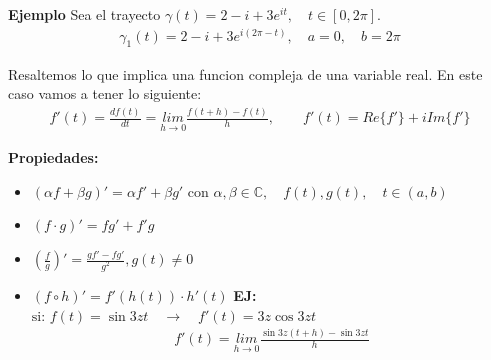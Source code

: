 \documentclass{article}
\begin{document}
\textbf{Ejemplo } Sea el trayecto $ \gamma (t) = 2-i + 3 e ^ {i t }, \quad t \in [0,2\pi ] $.
\begin{gather*}
  \gamma_1 (t) = 2- i + 3 e ^ {i(2\pi - t)}, \quad a= 0 , \quad b= 2\pi
\end{gather*}

\hfill 

\hfill

\hfill

Resaltemos lo que implica una funcion compleja de una variable real. En este caso vamos a tener lo siguiente: 
\begin{gather*}
  f'(t) = \frac{d f(t)  }{d t } = \underset{h \rightarrow 0 }{lim } \frac{f(t+h ) - f(t) }{h }, \qquad f'(t) = Re\{f' \} + i Im \{f' \}
\end{gather*}

\textbf{Propiedades: }
\begin{itemize}
  \item $ (\alpha f + \beta g )' = \alpha f' + \beta g'  $ con $ \alpha,\beta \in \mathbb{C}, \quad f(t),g(t), \quad t \in (a,b)  $
  \item $ (f \cdot g)' = fg' + f'g  $
  \item $\left(\frac{f }{g }\right)' = \frac{g f' - f g' }{g^2 }, g(t) \neq 0 $ 
  \item $(f \circ h)' = f'(h(t)) \cdot h'(t)$
    \textbf{EJ: } $ \text{si: }f(t) = \sin{3zt }\quad \rightarrow \quad f'(t) = 3z \cos{3zt } $
    \begin{gather*}
      f'(t) = \underset{h  \rightarrow 0 }{lim}\frac{\sin{3z(t + h )} - \sin{3zt }}{h } 
    \end{gather*}
\end{itemize}
\end{document}

